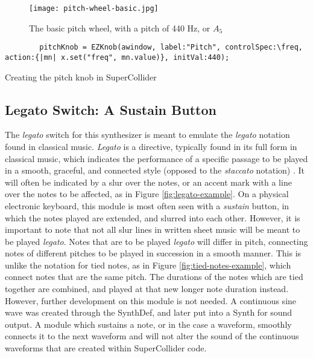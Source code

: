 \begin{figure}
  \centering
  \texttt{[image: pitch-wheel-basic.jpg]}
  \caption{The basic pitch wheel, with a pitch of 440 Hz, or $A_5$}
  \label{fig:pitch-wheel-basic}
\end{figure}

\begin{listing}
	\begin{lstlisting}
		pitchKnob = EZKnob(awindow, label:"Pitch", controlSpec:\freq, action:{|mn| x.set("freq", mn.value)}, initVal:440);
	\end{lstlisting}
	\caption{Creating the pitch knob in SuperCollider}
	\label{lst:pitch-knob-waveform}
\end{listing}



\subsection{Legato Switch: A Sustain Button}

The \textit{legato} switch for this synthesizer is meant to emulate the \textit{legato} notation found in classical music. \textit{Legato} is a directive, typically found in its full form in classical music, which indicates the performance of a specific passage to be played in a smooth, graceful, and connected style (opposed to the \textit{staccato} notation) \cite{Winer_2018}. It will often be indicated by a slur over the notes, or an accent mark with a line over the notes to be affected, as in Figure \ref{fig:legato-example}\cite{Henle_2009}. On a physical electronic keyboard, this module is most often seen with a \textit{sustain} button, in which the notes played are extended, and slurred into each other. However, it is important to note that not all slur lines in written sheet music will be meant to be played \textit{legato}. Notes that are to be played \textit{legato} will differ in pitch, connecting notes of different pitches to be played in succession in a smooth manner. This is unlike the notation for tied notes, as in Figure \ref{fig:tied-notes-example}\cite{Lung_2016}, which connect notes that are the same pitch. The durations of the notes which are tied together are combined, and played at that new longer note duration instead. However, further development on this module is not needed. A continuous sine wave was created through the SynthDef, and later put into a Synth for sound output. A module which sustains a note, or in the case a waveform, smoothly connects it to the next waveform and will not alter the sound of the continuous waveforms that are created within SuperCollider code.

